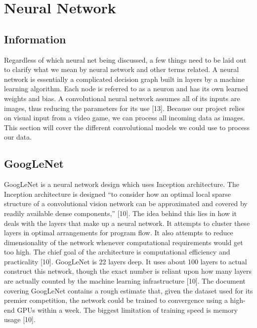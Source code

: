 \documentclass{scrreprt}
\begin{document}
\section{Neural Network}

\subsection{Information}
Regardless of which neural net being discussed, a few things need to be laid out to clarify what
we mean by neural network and other terms related. A neural network is essentially a
complicated decision graph built in layers by a machine learning algorithm. Each node is
referred to as a neuron and has its own learned weights and bias. A convolutional neural network
assumes all of its inputs are images, thus reducing the parameters for its use [13]. Because our
project relies on visual input from a video game, we can process all incoming data as images.
This section will cover the different convolutional models we could use to process our data.

\subsection{GoogLeNet}
GoogLeNet is a neural network design which uses Inception architecture. The Inception
architecture is designed “to consider how an optimal local sparse structure of a convolutional
vision network can be approximated and covered by readily available dense components,” [10].
The idea behind this lies in how it deals with the layers that make up a neural network. It
attempts to cluster these layers in optimal arrangements for program flow. It also attempts to
reduce dimensionality of the network whenever computational requirements would get too high.
The chief goal of the architecture is computational efficiency and practicality [10]. GoogLeNet is
22 layers deep. It uses about 100 layers to actual construct this network, though the exact number
is reliant upon how many layers are actually counted by the machine learning infrastructure [10].
The document covering GoogLeNet contains a rough estimate that, given the dataset used for its
premier competition, the network could be trained to convergence using a high-end GPUs within
a week. The biggest limitation of training speed is memory usage [10].
\end{document}
